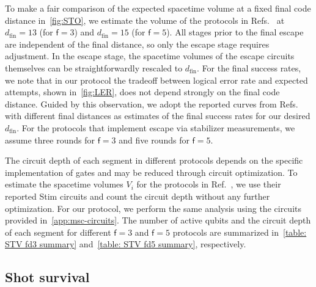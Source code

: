\documentclass[%
    aps, 
    physrev,
    reprint,
]{revtex4-2}
\newcommand{\fd}[1]{\mathsf{f}=#1}
\newcommand{\fin}{_\mathrm{fin}}
\begin{document}
To make a fair comparison of the expected spacetime volume at a fixed final code distance in~\cref{fig:STO}, we estimate the volume of the protocols in Refs.~\cite{gidney2024magic, chen2025efficient, claes2025cultivatingtstatessurface, vaknin2025magic} at $d\fin=13$ (for $\mathsf{f}=3$) and $d\fin=15$ (for $\mathsf{f}=5$). 
All stages prior to the final escape are independent of the final distance, so only the escape stage requires adjustment. 
In the escape stage, the spacetime volumes of the escape circuits themselves can be straightforwardly rescaled to $d\fin$. 
For the final success rates, we note that in our protocol the tradeoff between logical error rate and expected attempts, shown in~\cref{fig:LER}, does not depend strongly on the final code distance. 
Guided by this observation, we adopt the reported curves from Refs.~{\cite{gidney2024magic, chen2025efficient, claes2025cultivatingtstatessurface, vaknin2025magic} with different final distances} 
as estimates of the final success rates for our desired $d\fin$. 
For the protocols that implement escape via stabilizer measurements, we assume three rounds for $\fd3$ and five rounds for $\fd5$.

The circuit depth of each segment in different protocols depends on the specific implementation of gates and may be reduced through circuit optimization. 
To estimate the spacetime volumes $V_i$ for the protocols in Ref.~\cite{gidney2024magic, chen2025efficient}, we use their reported Stim circuits and count the circuit depth without any further optimization. 
For our protocol, we perform the same analysis using the circuits provided in~\cref{app:msc-circuits}. 
The number of active qubits and the circuit depth of each segment for different {$\mathsf f=3$ and $\mathsf f=5$} protocols are summarized in~\cref{table: STV fd3 summary} and~\cref{table: STV fd5 summary}, respectively.

\subsection{Shot survival}
\end{document}
